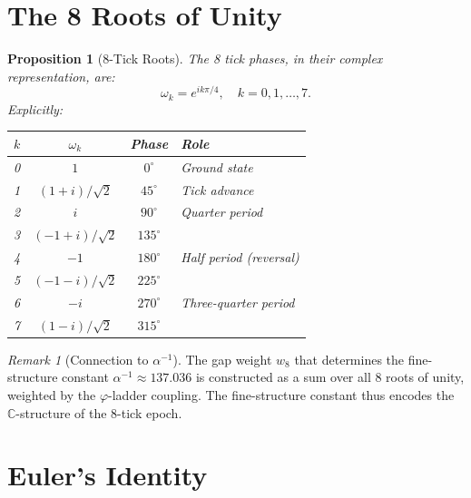 \documentclass[12pt,a4paper]{article}
\newtheorem{proposition}[theorem]{Proposition}
\theoremstyle{definition}
\theoremstyle{remark}
\newtheorem{remark}[theorem]{Remark}
\begin{document}
\section{The 8 Roots of Unity}
\label{sec:roots}

\begin{proposition}[8-Tick Roots]
\label{prop:roots}
The 8 tick phases, in their complex representation, are:
\begin{equation}
  \omega_k = e^{ik\pi/4}, \quad k = 0, 1, \ldots, 7.
\end{equation}
Explicitly:
\begin{center}
\renewcommand{\arraystretch}{1.3}
\begin{tabular}{cccl}
\toprule
$k$ & $\omega_k$ & Phase & Role \\
\midrule
0 & $1$ & $0^\circ$ & Ground state \\
1 & $(1+i)/\sqrt{2}$ & $45^\circ$ & Tick advance \\
2 & $i$ & $90^\circ$ & Quarter period \\
3 & $(-1+i)/\sqrt{2}$ & $135^\circ$ & \\
4 & $-1$ & $180^\circ$ & Half period (reversal) \\
5 & $(-1-i)/\sqrt{2}$ & $225^\circ$ & \\
6 & $-i$ & $270^\circ$ & Three-quarter period \\
7 & $(1-i)/\sqrt{2}$ & $315^\circ$ & \\
\bottomrule
\end{tabular}
\end{center}
\end{proposition}

\begin{remark}[Connection to $\alpha^{-1}$]
The gap weight $w_8$ that determines the fine-structure
constant $\alpha^{-1} \approx 137.036$ is constructed as a
sum over all 8 roots of unity, weighted by the $\varphi$-ladder
coupling.  The fine-structure constant thus encodes the
$\mathbb{C}$-structure of the 8-tick epoch.
\end{remark}

\section{Euler's Identity}
\label{sec:euler}
\end{document}
